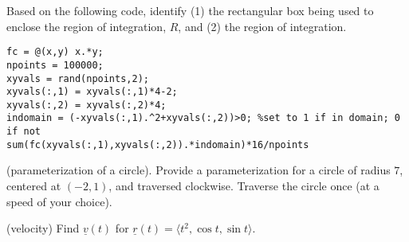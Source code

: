 \documentclass[12pt,letterpaper,noanswers]{exam}
\newcommand{\mb}[1]{\underline{#1}}
\begin{document}
 \pdfpageheight 11in 
  \pdfpagewidth 8.5in



\begin{questions}
\item Based on the following code, identify (1) the rectangular box being used to enclose the region of integration, $R$, and (2) the region of integration.

\begin{lstlisting}
fc = @(x,y) x.*y;
npoints = 100000;
xyvals = rand(npoints,2);
xyvals(:,1) = xyvals(:,1)*4-2;
xyvals(:,2) = xyvals(:,2)*4;
indomain = (-xyvals(:,1).^2+xyvals(:,2))>0; %set to 1 if in domain; 0 if not
sum(fc(xyvals(:,1),xyvals(:,2)).*indomain)*16/npoints
\end{lstlisting}

\vfill

\item (parameterization of a circle). Provide a parameterization for a circle of radius $7$, centered at $(-2,1)$, and traversed clockwise.  Traverse the circle once (at a speed of your choice).
\vfill

\item (velocity) Find $\mb v(t)$ for $\mb{r}(t) = \langle t^2,  \cos t, \sin t\rangle$.

\vfill

\end{questions}
\end{document}
